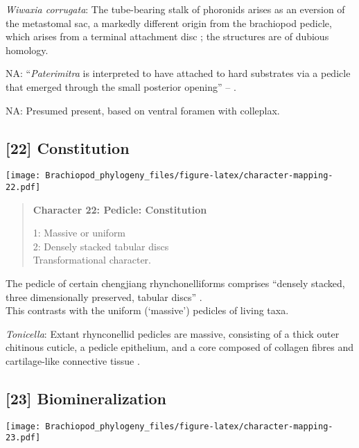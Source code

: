 \documentclass[openany]{book}
\theoremstyle{definition}
\theoremstyle{definition}
\theoremstyle{definition}
\theoremstyle{remark}
\begin{document}
\hypertarget{Wiwaxia_corrugata-coding-21}{}
\emph{Wiwaxia corrugata}: The tube-bearing stalk of phoronids arises as
an eversion of the metastomal sac, a markedly different origin from the
brachiopod pedicle, which arises from a terminal attachment disc
\citep{Young2002}; the structures are of dubious homology.

\hypertarget{NA-coding-21}{}
NA: ``\emph{Paterimitra} is interpreted to have attached to hard
substrates via a pedicle that emerged through the small posterior
opening'' -- \citet{Skovsted2009Thescleritome}.

\hypertarget{NA-coding-21}{}
NA: Presumed present, based on ventral foramen with colleplax.

\subsection*{{[}22{]} Constitution}\label{constitution-1}

\texttt{[image: Brachiopod\_phylogeny\_files/figure-latex/character-mapping-22.pdf]}

\begin{quote}
\textbf{Character 22: Pedicle: Constitution}

1: Massive or uniform\\
2: Densely stacked tabular discs\\
Transformational character.
\end{quote}

The pedicle of certain chengjiang rhynchonelliforms comprises ``densely
stacked, three dimensionally preserved, tabular discs''
\citep{Holmer2018Evolutionarysignificance}.\\
This contrasts with the uniform (`massive') pedicles of living taxa.

\hypertarget{Tonicella-coding-22}{}
\emph{Tonicella}: Extant rhynconellid pedicles are massive, consisting
of a thick outer chitinous cuticle, a pedicle epithelium, and a core
composed of collagen fibres and cartilage-like connective tissue
\citep{Holmer2018Evolutionarysignificance}.

\subsection*{{[}23{]} Biomineralization}\label{biomineralization}

\texttt{[image: Brachiopod\_phylogeny\_files/figure-latex/character-mapping-23.pdf]}
\end{document}
